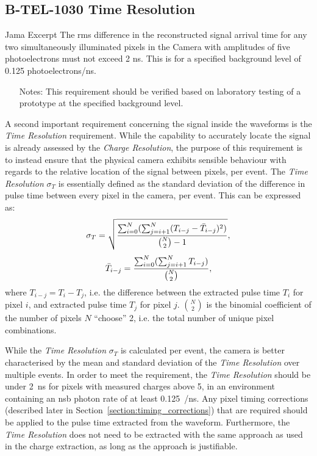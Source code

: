 \subsection{B-TEL-1030 Time Resolution} \label{section:time_res}

\begin{requirement}{Jama Excerpt} 
The rms difference in the reconstructed signal arrival time for any two simultaneously illuminated pixels in the Camera with amplitudes of five photoelectrons must not exceed 2 ns. This is for a specified background level of 0.125 photoelectrons/ns.

\begin{itemize}
\item [Notes:] This requirement should be verified based on laboratory testing of a prototype at the specified background level.
\end{itemize}
\end{requirement}

A second important requirement concerning the signal inside the waveforms is the \textit{Time Resolution} requirement. While the capability to accurately locate the signal is already assessed by the \textit{Charge Resolution}, the purpose of this requirement is to instead ensure that the physical camera exhibits sensible behaviour with regards to the relative location of the signal between pixels, per event. The \textit{Time Resolution} $\sigma_T$ is essentially defined as the standard deviation of the difference in pulse time between every pixel in the camera, per event. This can be expressed as:
\begin{equation} \label{eq:time_res}
\sigma_T = \sqrt{\frac{\sum_{i=0}^N(\sum_{j=i+1}^N (T_{i-j} - \bar{T}_{i-j})^2)}{\binom{N}{2} - 1}},
\end{equation}
\begin{equation} \label{eq:time_res2}
\bar{T}_{i-j} = \frac{\sum_{i=0}^N(\sum_{j=i+1}^N T_{i-j})}{\binom{N}{2}},
\end{equation}
where $T_{i-j} = T_i - T_j$, i.e. the difference between the extracted pulse time $T_i$ for pixel $i$, and extracted pulse time $T_j$ for pixel $j$. $\binom{N}{2}$ is the binomial coefficient of the number of pixels $N$ ``choose'' 2, i.e. the total number of unique pixel combinations.

While the \textit{Time Resolution} $\sigma_T$ is calculated per event, the camera is better characterised by the mean and standard deviation of the \textit{Time Resolution} over multiple events. In order to meet the requirement, the \textit{Time Resolution} should be under \SI{2}{ns} for pixels with measured charges above \SI{5}{\pe}, in an environment containing an \gls{nsb} photon rate of at least \SI{0.125}{\pe/ns}. Any pixel timing corrections (described later in Section~\ref{section:timing_corrections}) that are required should be applied to the pulse time extracted from the waveform. Furthermore, the \textit{Time Resolution} does not need to be extracted with the same approach as used in the charge extraction, as long as the approach is justifiable.

